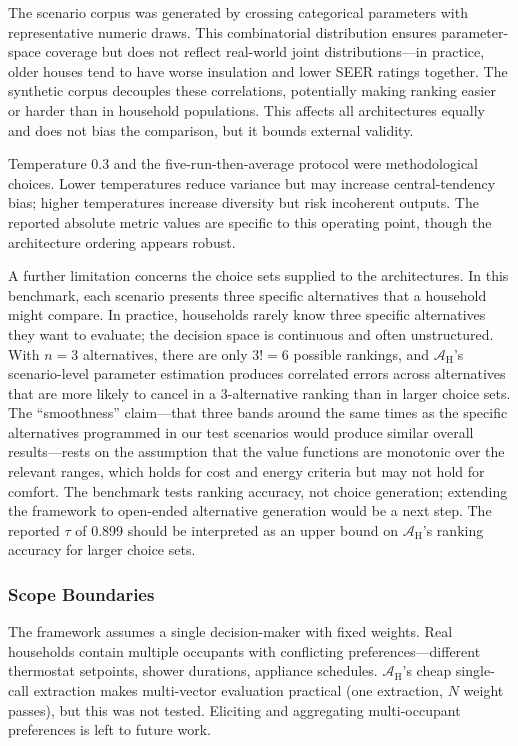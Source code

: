 \documentclass[final,3p,times]{elsarticle}
\begin{document}
The scenario corpus was generated by crossing categorical parameters with representative numeric draws. This combinatorial distribution ensures parameter-space coverage but does not reflect real-world joint distributions---in practice, older houses tend to have worse insulation and lower SEER ratings together. The synthetic corpus decouples these correlations, potentially making ranking easier or harder than in household populations. This affects all architectures equally and does not bias the comparison, but it bounds external validity.

Temperature 0.3 and the five-run-then-average protocol were methodological choices. Lower temperatures reduce variance but may increase central-tendency bias; higher temperatures increase diversity but risk incoherent outputs. The reported absolute metric values are specific to this operating point, though the architecture ordering appears robust.

A further limitation concerns the choice sets supplied to the architectures. In this benchmark, each scenario presents three specific alternatives that a household might compare. In practice, households rarely know three specific alternatives they want to evaluate; the decision space is continuous and often unstructured. With $n=3$ alternatives, there are only $3! = 6$ possible rankings, and $\mathcal{A}_{\text{H}}$'s scenario-level parameter estimation produces correlated errors across alternatives that are more likely to cancel in a 3-alternative ranking than in larger choice sets. The ``smoothness'' claim---that three bands around the same times as the specific alternatives programmed in our test scenarios would produce similar overall results---rests on the assumption that the value functions are monotonic over the relevant ranges, which holds for cost and energy criteria but may not hold for comfort. The benchmark tests ranking accuracy, not choice generation; extending the framework to open-ended alternative generation would be a next step. The reported $\tau$ of 0.899 should be interpreted as an upper bound on $\mathcal{A}_{\text{H}}$'s ranking accuracy for larger choice sets.

\subsubsection{Scope Boundaries}

The framework assumes a single decision-maker with fixed weights. Real households contain multiple occupants with conflicting preferences---different thermostat setpoints, shower durations, appliance schedules. $\mathcal{A}_{\text{H}}$'s cheap single-call extraction makes multi-vector evaluation practical (one extraction, $N$ weight passes), but this was not tested. Eliciting and aggregating multi-occupant preferences \cite{keeneyraiffa1976} is left to future work.
\end{document}
